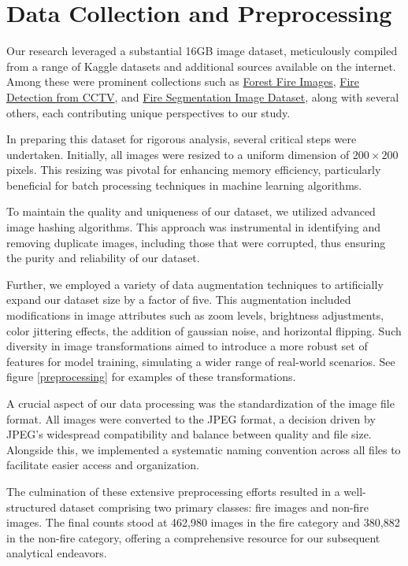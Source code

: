 \section{Data Collection and Preprocessing}

Our research leveraged a substantial 16GB image dataset, meticulously compiled from a range of Kaggle datasets and additional sources available on the internet. Among these were prominent collections such as \href{https://www.kaggle.com/datasets/mohnishsaiprasad/forest-fire-images}{Forest Fire Images}, \href{https://www.kaggle.com/datasets/ritupande/fire-detection-from-cctv}{Fire Detection from CCTV}, and \href{https://www.kaggle.com/datasets/diversisai/fire-segmentation-image-dataset}{Fire Segmentation Image Dataset}, along with several others, each contributing unique perspectives to our study.

In preparing this dataset for rigorous analysis, several critical steps were undertaken. Initially, all images were resized to a uniform dimension of \(200 \times 200\) pixels. This resizing was pivotal for enhancing memory efficiency, particularly beneficial for batch processing techniques in machine learning algorithms.

To maintain the quality and uniqueness of our dataset, we utilized advanced image hashing algorithms. This approach was instrumental in identifying and removing duplicate images, including those that were corrupted, thus ensuring the purity and reliability of our dataset.

Further, we employed a variety of data augmentation techniques to artificially expand our dataset size by a factor of five. This augmentation included modifications in image attributes such as zoom levels, brightness adjustments, color jittering effects, the addition of gaussian noise, and horizontal flipping. Such diversity in image transformations aimed to introduce a more robust set of features for model training, simulating a wider range of real-world scenarios. See figure \ref{preprocessing} for examples of these transformations.

A crucial aspect of our data processing was the standardization of the image file format. All images were converted to the JPEG format, a decision driven by JPEG's widespread compatibility and balance between quality and file size. Alongside this, we implemented a systematic naming convention across all files to facilitate easier access and organization.

The culmination of these extensive preprocessing efforts resulted in a well-structured dataset comprising two primary classes: fire images and non-fire images. The final counts stood at 462,980 images in the fire category and 380,882 in the non-fire category, offering a comprehensive resource for our subsequent analytical endeavors.


